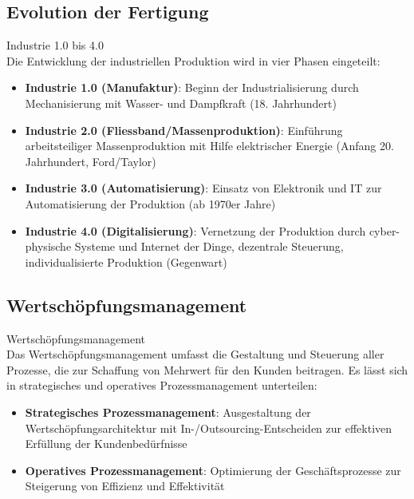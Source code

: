 \subsection{Evolution der Fertigung}

\begin{concept}{Industrie 1.0 bis 4.0}\\
Die Entwicklung der industriellen Produktion wird in vier Phasen eingeteilt:
\begin{itemize}
    \item \textbf{Industrie 1.0 (Manufaktur)}: Beginn der Industrialisierung durch Mechanisierung mit Wasser- und Dampfkraft (18. Jahrhundert)
    \item \textbf{Industrie 2.0 (Fliessband/Massenproduktion)}: Einführung arbeitsteiliger Massenproduktion mit Hilfe elektrischer Energie (Anfang 20. Jahrhundert, Ford/Taylor)
    \item \textbf{Industrie 3.0 (Automatisierung)}: Einsatz von Elektronik und IT zur Automatisierung der Produktion (ab 1970er Jahre)
    \item \textbf{Industrie 4.0 (Digitalisierung)}: Vernetzung der Produktion durch cyber-physische Systeme und Internet der Dinge, dezentrale Steuerung, individualisierte Produktion (Gegenwart)
\end{itemize}
\end{concept}

\subsection{Wertschöpfungsmanagement}

\begin{definition}{Wertschöpfungsmanagement}\\
Das Wertschöpfungsmanagement umfasst die Gestaltung und Steuerung aller Prozesse, die zur Schaffung von Mehrwert für den Kunden beitragen. Es lässt sich in strategisches und operatives Prozessmanagement unterteilen:
\begin{itemize}
    \item \textbf{Strategisches Prozessmanagement}: Ausgestaltung der Wertschöpfungsarchitektur mit In-/Outsourcing-Entscheiden zur effektiven Erfüllung der Kundenbedürfnisse
    \item \textbf{Operatives Prozessmanagement}: Optimierung der Geschäftsprozesse zur Steigerung von Effizienz und Effektivität
\end{itemize}
\end{definition}

